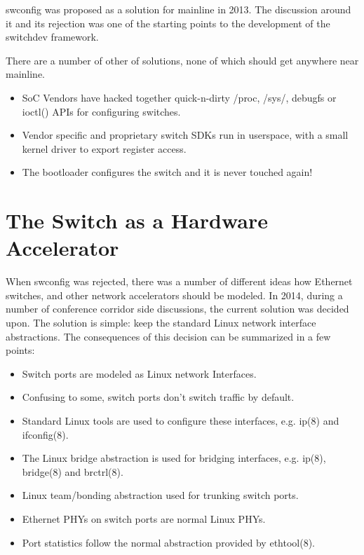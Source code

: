 \documentclass[letterpaper]{article}
\begin{document}
swconfig was proposed \cite{swconfig} as a solution for mainline in
2013. The discussion around it and its rejection was one of the
starting points to the development of the switchdev framework.

There are a number of other of solutions, none of which should get
anywhere near mainline.

\begin{itemize}
\item SoC Vendors have hacked together quick-n-dirty /proc, /sys/,
  debugfs or ioctl() APIs for configuring switches.
\item Vendor specific and proprietary switch SDKs run in userspace,
  with a small kernel driver to export register access.
\item The bootloader configures the switch and it is never touched again!
\end{itemize}

\section{The Switch as a Hardware Accelerator}

When swconfig was rejected, there was a number of different ideas how
Ethernet switches, and other network accelerators should be modeled.
In 2014, during a number of conference corridor side discussions, the
current solution was decided upon. The solution is simple: keep the
standard Linux network interface abstractions. The consequences of
this decision can be summarized in a few points:

\begin{itemize}
\item Switch ports are modeled as Linux network Interfaces.
\item Confusing to some, switch ports don't switch traffic by default.
\item Standard Linux tools are used to configure these interfaces, e.g. ip(8) and ifconfig(8).
\item The Linux bridge abstraction is used for bridging interfaces, e.g. ip(8), bridge(8) and brctrl(8).
\item Linux team/bonding abstraction used for trunking switch ports.
\item Ethernet PHYs on switch ports are normal Linux PHYs.
\item Port statistics follow the normal abstraction provided by ethtool(8).
\end{itemize}
\end{document}
